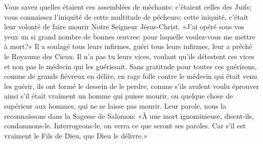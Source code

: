 Vous savez quelles étaient ces assemblées de méchants:
	c’étaient celles des Juifs;
	vous connaissez l’iniquité de cette multitude de pécheurs:
	cette iniquité,
		c’était leur volonté de faire mourir Notre Seigneur Jésus-Christ.
«J’ai opéré sous vos yeux un si grand nombre de bonnes œuvres:
	pour laquelle voulez-vous me mettre à mort?»
Il a soulagé tous leurs infirmes, guéri tous leurs infirmes,
	leur a prêché le Royaume des Cieux.
Il n’a pas tu leurs vices, voulant qu’ils détestent ces vices
	et non pas le médecin qui les guérissait.
Sans gratitude pour toutes ces guérisons, comme de grands fiévreux en délire,
	en rage folle contre le médecin qui était venu les guérir,
	ils ont formé le dessein de le perdre,
	comme s’ils avalent voulu éprouver ainsi
		s’il était vraiment un homme qui puisse mourir,
	ou quelque chose de supérieur aux hommes, qui ne se laisse pas mourir.
Leur parole, nous la reconnaissons dans la Sagesse de Salomon:
	«À une mort ignominieuse, disent-ils, condamnons-le.
	Interrogeons-le, on verra ce que seront ses paroles.
	Car s’il est vraiment le Fils de Dieu, que Dieu le délivre.»
